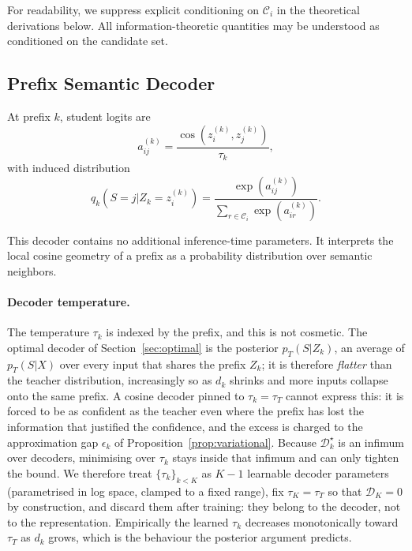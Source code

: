 \documentclass[11pt]{article}
\newcommand{\cD}{\mathcal{D}}
\newcommand{\simcos}{\operatorname{cos}}
\begin{document}
For readability, we suppress explicit conditioning on $\mathcal C_i$ in the theoretical derivations below.
All information-theoretic quantities may be understood as conditioned on the candidate set.


\subsection{Prefix Semantic Decoder}

At prefix $k$, student logits are
\begin{equation}
    a_{ij}^{(k)}
    =
    \frac{
        \simcos(
            z_i^{(k)},
            z_j^{(k)}
        )
    }{\tau_k},
\end{equation}
with induced distribution
\begin{equation}
\boxed{
    q_k(S=j|Z_k=z_i^{(k)})
    =
    \frac{\exp(a_{ij}^{(k)})}
    {
        \sum_{r\in\mathcal C_i}
        \exp(a_{ir}^{(k)})
    }.
}
\label{eq:student}
\end{equation}

This decoder contains no additional inference-time parameters.
It interprets the local cosine geometry of a prefix as a probability distribution over semantic neighbors.

\paragraph{Decoder temperature.}
\label{sec:method-decoder-temperature}
The temperature $\tau_k$ is indexed by the prefix, and this is not cosmetic.
The optimal decoder of Section~\ref{sec:optimal} is the posterior $p_T(S|Z_k)$, an average of $p_T(S|X)$ over every input that shares the prefix $Z_k$; it is therefore \emph{flatter} than the teacher distribution, increasingly so as $d_k$ shrinks and more inputs collapse onto the same prefix.
A cosine decoder pinned to $\tau_k=\tau_T$ cannot express this: it is forced to be as confident as the teacher even where the prefix has lost the information that justified the confidence, and the excess is charged to the approximation gap $\epsilon_k$ of Proposition~\ref{prop:variational}.
Because $\cD_k^\star$ is an infimum over decoders, minimising over $\tau_k$ stays inside that infimum and can only tighten the bound.
We therefore treat $\{\tau_k\}_{k<K}$ as $K-1$ learnable decoder parameters (parametrised in log space, clamped to a fixed range), fix $\tau_K=\tau_T$ so that $\cD_K=0$ by construction, and discard them after training: they belong to the decoder, not to the representation.
Empirically the learned $\tau_k$ decreases monotonically toward $\tau_T$ as $d_k$ grows, which is the behaviour the posterior argument predicts.
\end{document}
